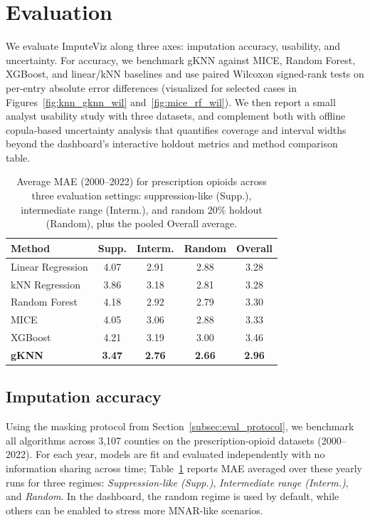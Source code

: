 \documentclass{egpubl}
\newcommand{\gknn}{gKNN\xspace}
\newcommand{\tool}{ImputeViz\xspace}
\begin{document}
\section{Evaluation}
\label{sec:evaluation}
We evaluate \tool along three axes: imputation accuracy, usability, and uncertainty. For accuracy, we benchmark gKNN against MICE, Random Forest, XGBoost, and linear/kNN baselines and use paired Wilcoxon signed-rank tests on per-entry absolute error differences (visualized for selected cases in Figures~\ref{fig:knn_gknn_wil} and~\ref{fig:mice_rf_wil}). We then report a small analyst usability study with three datasets, and complement both with offline copula-based uncertainty analysis that quantifies coverage and interval widths beyond the dashboard’s interactive holdout metrics and method comparison table.

\begin{table}[ht]
  \centering
  \caption{Average MAE (2000--2022) for prescription opioids across three evaluation settings: suppression-like (Supp.), intermediate range (Interm.), and random 20\% holdout (Random), plus the pooled Overall average.}
  \label{tab:metrics}
  \begin{tabular}{@{}lcccc@{}}
    \toprule
    Method & Supp. & Interm. & Random & Overall \\
    \midrule
    Linear Regression & 4.07 & 2.91 & 2.88 & 3.28 \\
    kNN Regression    & 3.86 & 3.18 & 2.81 & 3.28 \\
    Random Forest     & 4.18 & 2.92 & 2.79 & 3.30 \\
    MICE              & 4.05 & 3.06 & 2.88 & 3.33 \\
    XGBoost           & 4.21 & 3.19 & 3.00 & 3.46 \\
    \textbf{\gknn}    & \textbf{3.47} & \textbf{2.76} & \textbf{2.66} & \textbf{2.96} \\
    \bottomrule
  \end{tabular}
\end{table}
\vspace{-8pt}

\subsection{Imputation accuracy}
\label{subsec:iacc}

Using the masking protocol from Section~\ref{subsec:eval_protocol}, we benchmark all algorithms across 3{,}107 counties on the prescription-opioid datasets (2000--2022). For each year, models are fit and evaluated independently with no information sharing across time; Table~\ref{tab:metrics} reports MAE averaged over these yearly runs for three regimes: \emph{Suppression-like (Supp.)}, \emph{Intermediate range (Interm.)}, and \emph{Random}. In the dashboard, the random regime is used by default, while others can be enabled to stress more MNAR-like scenarios.
\end{document}
